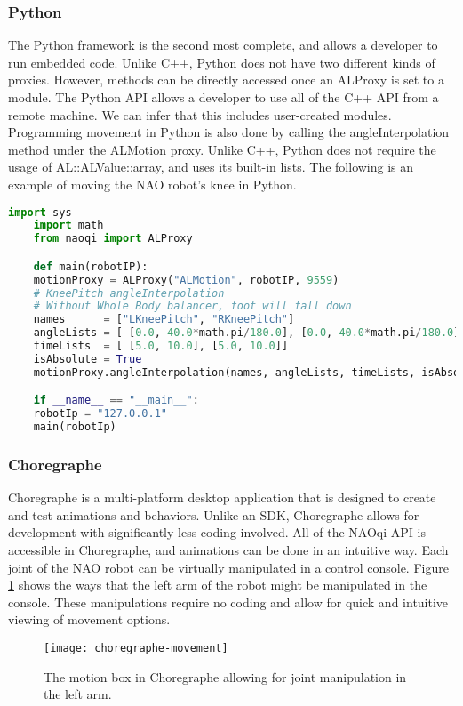 \subsubsection{Python}
The Python framework is the second most complete, and allows a developer to run embedded code.
Unlike C++, Python does not have two different kinds of proxies.
However, methods can be directly accessed once an ALProxy is set to a module.
The Python API allows a developer to use all of the C++ API from a remote machine.
We can infer that this includes user-created modules.
Programming movement in Python is also done by calling the angleInterpolation method under the ALMotion proxy.
Unlike C++, Python does not require the usage of AL::ALValue::array, and uses its built-in lists.
The following is an example of moving the NAO robot's knee in Python. \cite{NAOSDK:Python}
\begin{lstlisting}[language=Python]
	import sys
	import math
	from naoqi import ALProxy

	def main(robotIP):
    motionProxy = ALProxy("ALMotion", robotIP, 9559)
    # KneePitch angleInterpolation
    # Without Whole Body balancer, foot will fall down
    names      = ["LKneePitch", "RKneePitch"]
    angleLists = [ [0.0, 40.0*math.pi/180.0], [0.0, 40.0*math.pi/180.0]]
    timeLists  = [ [5.0, 10.0], [5.0, 10.0]]
    isAbsolute = True
    motionProxy.angleInterpolation(names, angleLists, timeLists, isAbsolute)

	if __name__ == "__main__":
    robotIp = "127.0.0.1"
    main(robotIp)

\end{lstlisting}

\subsubsection{Choregraphe}
Choregraphe is a multi-platform desktop application that is designed to create and test animations and behaviors.
Unlike an SDK, Choregraphe allows for development with significantly less coding involved.
All of the NAOqi API is accessible in Choregraphe, and animations can be done in an intuitive way.
Each joint of the NAO robot can be virtually manipulated in a control console. Figure \ref{fig:choregraphe-movement} shows the ways that the left arm of the robot might be manipulated in the console.
These manipulations require no coding and allow for quick and intuitive viewing of movement options.

\begin{figure}[H]
	\centering
	\texttt{[image: choregraphe-movement]}
	\caption{The motion box in Choregraphe allowing for joint manipulation in the left arm.}
	\label{fig:choregraphe-movement}
\end{figure}

